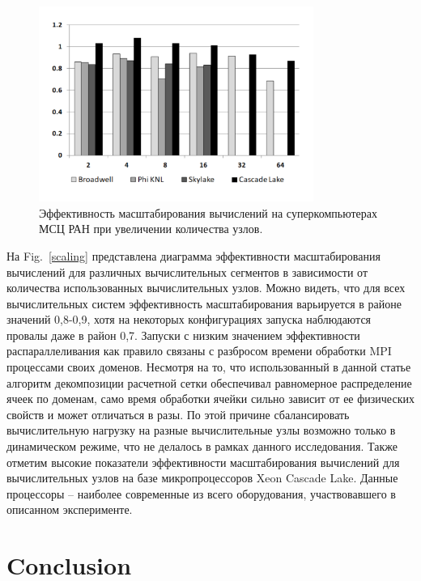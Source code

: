 \documentclass[
11pt,%
tightenlines,%
twoside,%
onecolumn,%
nofloats,%
nobibnotes,%
nofootinbib,%
superscriptaddress,%
noshowpacs,%
centertags]%
{revtex4}
\begin{document}
\begin{figure}[h]
\includegraphics[width=0.8\textwidth]{pics/scaling.pdf}
\caption{Эффективность масштабирования вычислений на суперкомпьютерах МСЦ РАН при увеличении количества узлов.}\label{fig:speedup}
\end{figure}

На Fig.~\ref{scaling} представлена диаграмма эффективности масштабирования вычислений для различных вычислительных сегментов в зависимости от количества использованных вычислительных узлов.
Можно видеть, что для всех вычислительных систем эффективность масштабирования варьируется в районе значений 0,8-0,9, хотя на некоторых конфигурациях запуска наблюдаются провалы даже в район 0,7.
Запуски с низким значением эффективности распараллеливания как правило связаны с разбросом времени обработки MPI процессами своих доменов.
Несмотря на то, что использованный в данной статье алгоритм декомпозиции расчетной сетки обеспечивал равномерное распределение ячеек по доменам, само время обработки ячейки сильно зависит от ее физических свойств и может отличаться в разы.
По этой причине сбалансировать вычислительную нагрузку на разные вычислительные узлы возможно только в динамическом режиме, что не делалось в рамках данного исследования.
Также отметим высокие показатели эффективности масштабирования вычислений для вычислительных узлов на базе микропроцессоров Xeon Cascade Lake.
Данные процессоры -- наиболее современные из всего оборудования, участвовавшего в описанном эксперименте.

\section{Conclusion}
\end{document}
